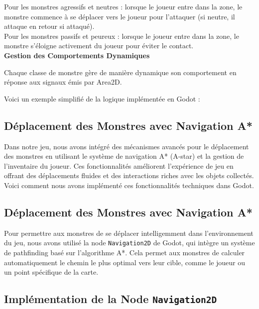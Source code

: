       Pour les monstres agressifs et neutres : lorsque le joueur entre dans la zone, le monstre commence à se déplacer vers le joueur pour l'attaquer 
      (si neutre, il attaque en retour si attaqué).
      \\

      Pour les monstres passifs et peureux : lorsque le joueur entre dans la zone, le monstre s'éloigne activement du joueur pour éviter le contact.
      \\

      \textbf{Gestion des Comportements Dynamiques}

      Chaque classe de monstre gère de manière dynamique son comportement en réponse aux signaux émis par Area2D. 


      Voici un exemple simplifié de la logique implémentée en Godot :%





\subsection{Déplacement des Monstres avec Navigation A* }




Dans notre jeu, nous avons intégré des mécanismes avancés pour le déplacement des monstres en utilisant le système de navigation A* (A-star) et 
la gestion de l'inventaire du joueur. Ces fonctionnalités améliorent l'expérience de jeu en offrant des déplacements fluides et des interactions riches
 avec les objets collectés. Voici comment nous avons implémenté ces fonctionnalités techniques dans Godot.

\subsection*{Déplacement des Monstres avec Navigation A*}

Pour permettre aux monstres de se déplacer intelligemment dans l'environnement du jeu, nous avons utilisé la node 
\texttt{Navigation2D} de Godot, qui intègre un système de pathfinding basé sur l'algorithme A*. Cela permet aux monstres 
de calculer automatiquement le chemin le plus optimal vers leur cible, comme le joueur ou un point spécifique de la carte.

\subsection*{Implémentation de la Node \texttt{Navigation2D}}

